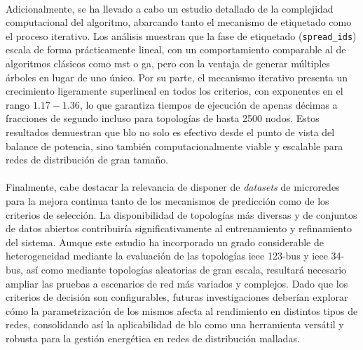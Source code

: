 \\
Adicionalmente, se ha llevado a cabo un estudio detallado de la complejidad computacional del algoritmo, abarcando tanto el mecanismo de etiquetado como el proceso iterativo. Los análisis muestran que la fase de etiquetado (\texttt{spread\_ids}) escala de forma prácticamente lineal, con un comportamiento comparable al de algoritmos clásicos como \gls{mst} o \gls{ga}, pero con la ventaja de generar múltiples árboles en lugar de uno único. Por su parte, el mecanismo iterativo presenta un crecimiento ligeramente superlineal en todos los criterios, con exponentes en el rango $1.17\!-\!1.36$, lo que garantiza tiempos de ejecución de apenas décimas a fracciones de segundo incluso para topologías de hasta 2500 nodos. Estos resultados demuestran que \gls{blo} no solo es efectivo desde el punto de vista del balance de potencia, sino también computacionalmente viable y escalable para redes de distribución de gran tamaño.\\
\\
Finalmente, cabe destacar la relevancia de disponer de \textit{datasets} de microredes para la mejora continua tanto de los mecanismos de predicción como de los criterios de selección. La disponibilidad de topologías más diversas y de conjuntos de datos abiertos contribuiría significativamente al entrenamiento y refinamiento del sistema. Aunque este estudio ha incorporado un grado considerable de heterogeneidad mediante la evaluación de las topologías \gls{ieee} 123-bus y \gls{ieee} 34-bus, así como mediante topologías aleatorias de gran escala, resultará necesario ampliar las pruebas a escenarios de red más variados y complejos. Dado que los criterios de decisión son configurables, futuras investigaciones deberían explorar cómo la parametrización de los mismos afecta al rendimiento en distintos tipos de redes, consolidando así la aplicabilidad de \gls{blo} como una herramienta versátil y robusta para la gestión energética en redes de distribución malladas.